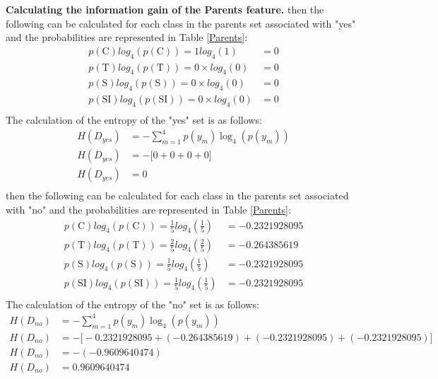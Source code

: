 \documentclass[10pt]{article}
\begin{document}
\textbf{Calculating the information gain of the Parents feature.}
then the following can be calculated for each class in the parents set associated with "yes" and the probabilities
are represented in Table \ref{Parents}:
\begin{align*}
    p(\text{C}) log_4 \left( p(\text{C}) \right) = 1 log_4 \left( 1 \right) &= 0\\
    p(\text{T}) log_4 \left( p(\text{T}) \right) = 0 \times log_4 \left( 0 \right) &= 0\\
    p(\text{S}) log_4 \left( p(\text{S}) \right) = 0 \times log_4 \left( 0 \right) &= 0\\
    p(\text{SI}) log_4 \left( p(\text{SI}) \right) = 0 \times log_4 \left( 0 \right) &= 0\\
\end{align*}
The calculation of the entropy of the "yes" set is as follows:
\begin{align*}
    H(D_{yes}) &= - \sum_{m=1}^{4} p(y_m) \log_4 \left( p(y_m) \right) \\
    H(D_{yes}) &= - \big[ 0 + 0 + 0 + 0\big] \\
    H(D_{yes}) &= 0 \\
\end{align*}
then the following can be calculated for each class in the parents set associated with "no" and the probabilities
are represented in Table \ref{Parents}:
\begin{align*}
    p(\text{C}) log_4 \left( p(\text{C}) \right) = \frac{1}{5} log_4 \left( \frac{1}{5} \right) &= -0.2321928095\\
    p(\text{T}) log_4 \left( p(\text{T}) \right) = \frac{2}{5} log_4 \left( \frac{2}{5} \right) &= -0.264385619\\
    p(\text{S}) log_4 \left( p(\text{S}) \right) = \frac{1}{5} log_4 \left( \frac{1}{5} \right) &= -0.2321928095\\
    p(\text{SI}) log_4 \left( p(\text{SI}) \right) = \frac{1}{5} log_4 \left( \frac{1}{5} \right) &= -0.2321928095\\
\end{align*}
The calculation of the entropy of the "no" set is as follows:
\begin{align*}
    H(D_{no}) &= - \sum_{m=1}^{4} p(y_m) \log_4 \left( p(y_m) \right) \\
    H(D_{no}) &= - \big[ -0.2321928095 + (-0.264385619) + (-0.2321928095) + (-0.2321928095)\big] \\
    H(D_{no}) &= - (-0.9609640474) \\
    H(D_{no}) &= 0.9609640474 \\
\end{align*}
\end{document}
